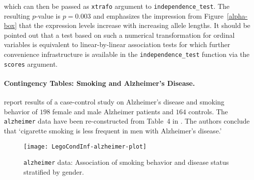 \documentclass{article}
\newcommand{\Robject}[1]{\texttt{#1}}
\newcommand{\Rcmd}[1]{\texttt{#1}}
\begin{document}
which 
can then be passed as \Rcmd{xtrafo} argument to \Rcmd{independence\_test}.
The resulting $p$-value is $p = 0.003$ and 
emphasizes the impression from Figure~\ref{alpha-box}
that the expression levels increase with increasing allele lengths.
It should be pointed out that a test based on such a numerical
transformation for ordinal variables is equivalent to 
linear-by-linear association tests \citep{Agresti2002} for which further
convenience infrastructure is available in the \Rcmd{independence\_test}
function via the \Rcmd{scores} argument.

\paragraph{Contingency Tables: Smoking and Alzheimer's Disease.}


\cite{SalibHillier1997} 
report results of a case-control study on Alzheimer's disease
and smoking behavior of $198$ female
and male Alzheimer patients and 
$164$ controls.
The \Robject{alzheimer} data 
have been 
re-constructed from Table~4 in \cite{SalibHillier1997}.
The authors conclude that `cigarette smoking is less frequent in 
men with Alzheimer's disease.' 

\begin{figure}
\begin{center}
\texttt{[image: LegoCondInf-alzheimer-plot]}
\caption{\Robject{alzheimer} data: Association of
smoking behavior and disease status stratified by gender. \label{alz-plot}}
\end{center}
\end{figure}
\end{document}
